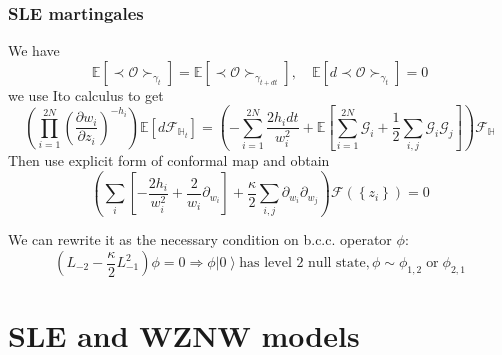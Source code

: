 \documentclass[pdftex]{beamer}
\theoremstyle{definition} \newtheorem{Def}{Definition}
\begin{document}
\begin{frame}
  \frametitle{SLE martingales}
  We have
  \begin{equation*}
    \mathbb{E}\left[\prec\mathcal{O}\succ_{\gamma_{t}}\right]=    \mathbb{E}\left[\prec\mathcal{O}\succ_{\gamma_{t+dt}}\right], \quad \mathbb{E}\left[d \prec\mathcal{O}\succ_{\gamma_{t}}\right]=0
  \end{equation*}
  we use Ito calculus to get
  \begin{equation*}
    \left(\prod_{i=1}^{2N}\left(\frac{\partial w_{i}}{\partial z_{i}}\right)^{-h_{i}}\right)\mathbb{E}\left[d 
      \mathcal{F}_{\mathbb{H}_{t}}\right]=\left(-\sum_{i=1}^{2N}\frac{2h_{i}dt}{w_{i}^{2}}+\mathbb{E}\left[\sum_{i=1}^{2N}\mathcal{G}_{i}+\frac{1}{2}
        \sum_{i,j}\mathcal{G}_{i}\mathcal{G}_{j}\right]\right)\mathcal{F}_{\mathbb{H}}
  \end{equation*}
  Then use explicit form of conformal map and obtain
  \begin{equation*}
    \left( \sum_{i}\left[-\frac{2h_{i}}{w_{i}^{2}} +\frac{2}{w_{i}}\partial_{w_{i}}\right]+\frac{\kappa}{2}\sum_{i,j}\partial_{w_{i}} \partial_{w_{j}}\right)\mathcal{F}(\left\{z_{i}\right\})=0
  \end{equation*}

  We can rewrite it as the necessary condition on b.c.c. operator $\phi$:
  \begin{equation*}
    (L_{-2}-\frac{\kappa}{2}L_{-1}^{2})\phi=0 \Longrightarrow \phi \left|0\right>  \text{has level 2 null state}, \phi\sim \phi_{1,2} \;\text{or}\; \phi_{2,1}
  \end{equation*}

\end{frame}

\section{SLE and WZNW models}
\label{sec:sle-wzw-models}
\end{document}
